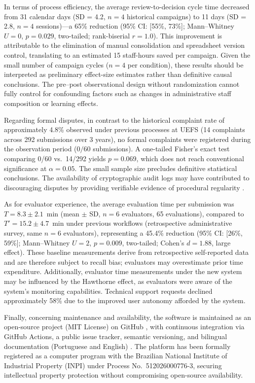 \documentclass[preprint,12pt,a4paper]{elsarticle}
\begin{document}
In terms of process efficiency, the average review-to-decision cycle time decreased from 31 calendar days (SD = 4.2, $n = 4$ historical campaigns) to 11 days (SD = 2.8, $n = 4$ sessions)---a 65\% reduction (95\% CI: [55\%, 73\%]; Mann--Whitney $U = 0$, $p = 0.029$, two-tailed; rank-biserial $r = 1.0$). This improvement is attributable to the elimination of manual consolidation and spreadsheet version control, translating to an estimated 15 staff-hours saved per campaign. Given the small number of campaign cycles ($n = 4$ per condition), these results should be interpreted as preliminary effect-size estimates rather than definitive causal conclusions. The pre--post observational design without randomization cannot fully control for confounding factors such as changes in administrative staff composition or learning effects.

Regarding formal disputes, in contrast to the historical complaint rate of approximately 4.8\% observed under previous processes at UEFS (14 complaints across 292 submissions over 3 years), no formal complaints were registered during the observation period ($0/60$ submissions). A one-tailed Fisher's exact test comparing 0/60 vs.\ 14/292 yields $p = 0.069$, which does not reach conventional significance at $\alpha = 0.05$. The small sample size precludes definitive statistical conclusions. The availability of cryptographic audit logs may have contributed to discouraging disputes by providing verifiable evidence of procedural regularity \citep{Hood2007}.

As for evaluator experience, the average evaluation time per submission was $T = 8.3 \pm 2.1$~min (mean $\pm$ SD, $n = 6$ evaluators, 65 evaluations), compared to $T' = 15.2 \pm 4.7$~min under previous workflows (retrospective administrative survey, same $n = 6$ evaluators), representing a 45.4\% reduction (95\% CI: [26\%, 59\%]; Mann--Whitney $U = 2$, $p = 0.009$, two-tailed; Cohen's $d = 1.88$, large effect). These baseline measurements derive from retrospective self-reported data and are therefore subject to recall bias; evaluators may overestimate prior time expenditure. Additionally, evaluator time measurements under the new system may be influenced by the Hawthorne effect, as evaluators were aware of the system's monitoring capabilities. Technical support requests declined approximately 58\% due to the improved user autonomy afforded by the system.

Finally, concerning maintenance and availability, the software is maintained as an open-source project (MIT License) on GitHub \citep{AvaliaMoreGitHub2026,AvaliaMoreDesktop2026}, with continuous integration via GitHub Actions, a public issue tracker, semantic versioning, and bilingual documentation (Portuguese and English) \citep{Sommerville2016}. The platform has been formally registered as a computer program with the Brazilian National Institute of Industrial Property (INPI) under Process No.\ 512026000776-3, securing intellectual property protection without compromising open-source availability.
\end{document}

